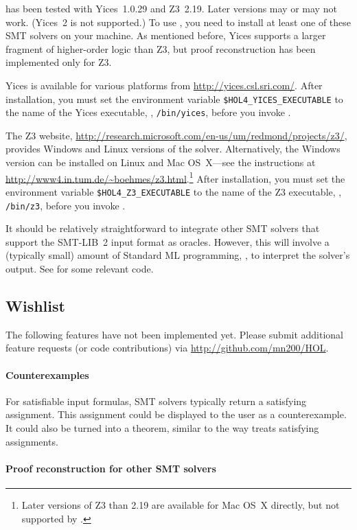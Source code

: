  has been tested with Yices~1.0.29 and Z3~2.19. Later
versions may or may not work.  (Yices~2 is not supported.)  To use
, you need to install at least one of these SMT solvers
on your machine.  As mentioned before, Yices supports a larger
fragment of higher-order logic than Z3, but proof reconstruction has
been implemented only for Z3.

Yices is available for various platforms from
\url{http://yices.csl.sri.com/}.  After installation, you must set the
environment variable {\tt \$HOL4\_YICES\_EXECUTABLE} to the name of
the Yices executable, \eg, {\tt /bin/yices}, before you invoke \HOL.

The Z3 website,
\url{http://research.microsoft.com/en-us/um/redmond/projects/z3/},
provides Windows and Linux versions of the solver.  Alternatively, the
Windows version can be installed on Linux and Mac OS~X---see the
instructions at
\url{http://www4.in.tum.de/~boehmes/z3.html}.\footnote{Later versions
  of Z3 than 2.19 are available for Mac OS~X directly, but not
  supported by \HOL.}  After installation, you must set the
environment variable {\tt \$HOL4\_Z3\_EXECUTABLE} to the name of the
Z3 executable, \eg, {\tt /bin/z3}, before you invoke \HOL.

It should be relatively straightforward to integrate other SMT solvers
that support the SMT-LIB~2 input format as oracles.  However, this
will involve a (typically small) amount of Standard ML programming,
\eg, to interpret the solver's output.  See  for some
relevant code.

\subsection{Wishlist}

The following features have not been implemented yet.  Please submit
additional feature requests (or code contributions) via
\url{http://github.com/mn200/HOL}.

\paragraph{Counterexamples}

For satisfiable input formulas, SMT solvers typically return a
satisfying assignment.  This assignment could be displayed to the
\HOL{} user as a counterexample.  It could also be turned into a
theorem, similar to the way  treats satisfying
assignments.

\paragraph{Proof reconstruction for other SMT solvers}


